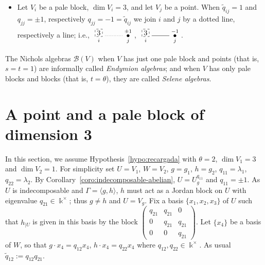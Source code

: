 \documentclass[pdftex]{sigma}
\numberwithin{equation}{section}
\newcommand{\toba}{\mathscr B}
\newcommand{\eny}{\mathfrak{E}}
\begin{document}
\begin{itemize}
If $\widetilde{q}_{ij}=-1$ and $q_{jj} = - 1$,
then we draw and edge labeled by $a_{j}$ between $i$ and $j$, i.e.,
$\xymatrix{ \underset{i}{\begin{tikzpicture}
\draw[dashed] (0,0) rectangle (0.36,0.36);
\end{tikzpicture}} \ar @{-}^{a_{j}}[r] & \overset{-1}{\underset{j}{\bullet}}}$\!.
Note that $V_i \oplus V_j \simeq \eny_{\star}(q)$ if $a_j \neq 0$.

\item Let $V_i$ be a pale block, $\dim V_i = 3$, and let $V_j$ be a point.
When $\widetilde{q}_{ij}=1$ and $q_{jj} = \pm 1$, respectively $q_{jj} = - 1=\widetilde{q}_{ij}$
we join $i$ and $j$ by a dotted line, respectively a line; i.e.,
$\xymatrix{ \underset{i}{\begin{tikzpicture}
\draw[dashed] (0,0) rectangle node[pos=.5] {$3$} (0.36,0.36);
\end{tikzpicture}} \ar @{.}[r] & \overset{\pm1}{\underset{j}{\bullet}}}$\!,
$\xymatrix{ \underset{i}{\begin{tikzpicture}
\draw[dashed] (0,0) rectangle node[pos=.5] {$3$} (0.36,0.36);
\end{tikzpicture}} \ar @{-}[r] & \overset{-1}{\underset{j}{\bullet}}}$\!.
\end{itemize}

The Nichols algebras $\toba(V)$ when $V$ has just one pale block and points (that is, $s=t=1$)
are informally called \emph{Endymion algebras}; and when $V$ has only pale blocks and blocks (that is, $t = \theta$),
they are called \emph{Selene algebras}.





\section{A point and a pale block of dimension 3} \label{sec:block+pt}

In this section, we assume Hypothesis~\ref{hypo:recargada} with $\theta = 2$, $\dim V_1= 3$ and $\dim V_2 = 1$.
For simplicity set $U = V_{1}$, $W = V_{2}$, $g = g_{1}$, $h = g_{2}$, $ q_{11}= \lambda_1$, $ q_{22}= \lambda_2$.
By Corollary~\ref{coro:indecomposable-abelian}, $U = U_g^{q_{11}}$ and $q_{11} = \pm 1$.
As $U$ is indecomposable and $\Gamma = \langle g,h \rangle$, $h$ must act as a Jordan block on $U$ with eigenvalue $q_{21} \in \Bbbk^{\times}$;
thus $g \neq h$ and $U = V_g$.
Fix a basis $\big\{x_1, x_2, x_{3}\big\}$ of $U$ such that $h_{\vert U}$ is given in this basis by the block
$\left(\begin{smallmatrix}
q_{21} & q_{21} & 0 \\
0 & q_{21} & q_{21} \\
0 & 0 & q_{21}
\end{smallmatrix}\right)$.
Let $\{x_{4}\}$ be a basis of $W$, so that $g\cdot x_{4} = q_{12}x_{4}$, $h\cdot x_{4} = q_{22}x_{4}$
where $q_{12}, q_{22} \in \Bbbk^{\times}$.
As usual $\widetilde{q}_{12} := q_{12}q_{21}$.
\end{document}
